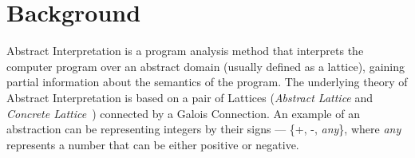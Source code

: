 \section{Background}

Abstract Interpretation is a program analysis method that interprets the computer program over an abstract domain
(usually defined as a lattice), gaining partial information about the semantics of the program.
The underlying theory of Abstract Interpretation is based on a pair of Lattices (\emph{Abstract Lattice} and
\emph{Concrete Lattice}~\cite{Blanchet:2002:AI})
connected by a Galois Connection.
An example of an abstraction can be representing integers by their signs --- \{+, -, \emph{any}\},
where \emph{any} represents a number that can be either positive or negative.